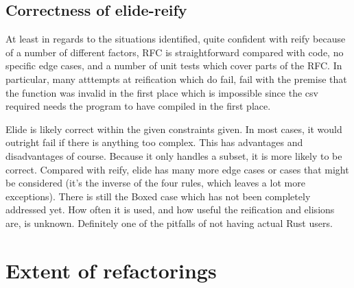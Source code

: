 \subsection{Correctness of elide-reify}

At least in regards to the situations identified, quite confident with reify because of a number of different factors, RFC is straightforward compared with code, no specific edge cases, and a number of unit tests which cover parts of the RFC. In particular, many atttempts at reification which do fail, fail with the premise that the function was invalid in the first place which is impossible since the csv required needs the program to have compiled in the first place. 


Elide is likely correct within the given constraints given. In most cases, it would outright fail if there is anything too complex. This has advantages and disadvantages of course. Because it only handles a subset, it is more likely to be correct. Compared with reify, elide has many more edge cases or cases that might be considered (it's the inverse of the four rules, which leaves a lot more exceptions). There is still the Boxed case which has not been completely addressed yet. How often it is used, and how useful the reification and elisions are, is unknown. Definitely one of the pitfalls of not having actual Rust users. 




\section{Extent of refactorings}

